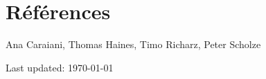 \documentclass[12pt]{article} %
\begin{document}
\section*{Références}

Ana Caraiani, Thomas Haines, Timo Richarz, Peter Scholze
 






\vfill %


\begin{center}
	\scriptsize
	Last updated: \today
\end{center}

\end{document}
